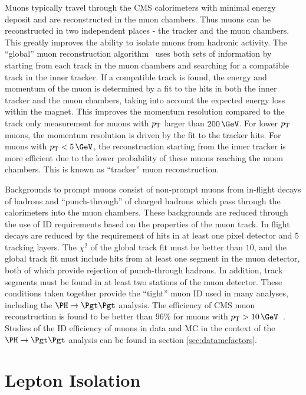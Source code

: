 Muons typically travel through the CMS calorimeters with minimal energy deposit
and are reconstructed in the muon chambers. Thus muons can be reconstructed
in two independent places - the tracker and the muon chambers. This
greatly improves the ability to isolate muons from hadronic activity. The
``global'' muon reconstruction algorithm~\cite{MuonReco} uses both sets of information by
starting from each track in the muon chambers and searching for a compatible
track in the inner tracker. If a compatible track is found, the energy and
momentum of the muon is determined by a fit to the hits in both the inner
tracker and the muon chambers, taking into account the expected energy loss
within the magnet. This improves the momentum resolution compared to
the track only measurement for muons with $p_{\mathrm{T}}$ larger than $200\,\GeV$. For
lower $p_{\mathrm{T}}$ muons, the momentum resolution is driven by the fit to the tracker
hits. For muons with $\pt < 5\,\GeV$, the reconstruction starting from the inner
tracker is more efficient due to the lower probability of these muons reaching
the muon chambers. This is known as ``tracker'' muon reconstruction.  

Backgrounds to prompt muons consist of non-prompt muons from in-flight decays of
hadrons and ``punch-through'' of charged hadrons which pass through the calorimeters
into the muon chambers. These backgrounds are reduced through the use of ID
requirements based on the properties of the muon track. In flight decays are
reduced by the requirement of hits in at least one pixel detector and $5$
tracking layers. The $\chi^{2}$ of the global track fit must be better than
$10$, and the global track fit must include hits from at least one segment in
the muon detector, both of which provide rejection of punch-through hadrons. In
addition, track segments must be found in at least two stations of the muon
detector. These conditions taken together provide the ``tight'' muon ID used in
many analyses, including the $\PH\to\Pgt\Pgt$ analysis.
The efficiency of CMS muon reconstruction is found to be better
than $96\%$ for muons with $\pt > 10\,\GeV$~\cite{MuonReco}. Studies of the ID efficiency of
muons in data and \ac{MC} in the context of the $\PH \to \Pgt\Pgt$ analysis can
be found in section \ref{sec:datamcfactors}.

\section{Lepton Isolation}
\label{sec:leptonisolation}

